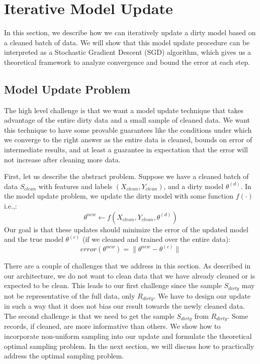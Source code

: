 \section{Iterative Model Update}\label{model-update}
In this section, we describe how we can iteratively update a dirty model based on
a cleaned batch of data.
We will show that this model update procedure can be interpreted as a Stochastic 
Gradient Descent (SGD) algorithm, which gives us a theoretical framework to analyze
convergence and bound the error at each step.

\subsection{Model Update Problem}
The high level challenge is that we want a model update technique that takes advantage of the entire dirty data and a small sample of cleaned data.
We want this technique to have some provable guarantees like the conditions under which we converge to the right answer as the entire data is cleaned, bounds on error of intermediate results, and at least a guarantee in expectation that the error will not increase after cleaning more data.  

First, let us describe the abstract problem.
Suppose we have a cleaned batch of data $S_{clean}$ with features and labels $(X_{clean},Y_{clean})$, and a dirty model $\theta^{(d)}$. 
In the model update problem, we update the dirty model with some function $f(\cdot)$ i.e.,:
\[
\theta^{new} \leftarrow f(X_{clean},Y_{clean},\theta^{(d)})
\]
Our goal is that these updates should minimize the error of the updated model and the true model $\theta^{(c)}$ (if we cleaned and trained over the entire data):
\[
error(\theta^{new}) = \| \theta^{new} - \theta^{(c)} \|
\]

There are a couple of challenges that we address in this section.
As described in our architecture, we do not want to clean data that we have already cleaned or is expected to be clean.
This leads to our first challenge since the sample $S_{dirty}$ may not be representative of the full data, only $R_{dirty}$. 
We have to design our update in such a way that it does not bias our result towards the newly cleaned data. 
The second challenge is that we need to get the sample $S_{dirty}$ from $R_{dirty}$.
Some records, if cleaned, are more informative than others.
We show how to incorporate non-uniform sampling into our update and formulate the theoretical optimal sampling problem.
In the next section, we will discuss how to practically address the optimal sampling problem.

